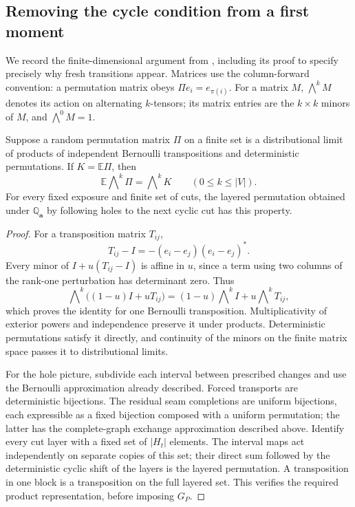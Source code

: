 \subsection{Removing the cycle condition from a first moment}

We record the finite-dimensional argument from
\cite[Lemma~4.2 and Proposition~4.3]{Ordering}, including its proof
to specify precisely why fresh transitions appear.  Matrices use the
column-forward convention: a permutation matrix obeys
$\Pi e_i=e_{\pi(i)}$.  For a matrix $M$, $\bigwedge^kM$ denotes
its action on alternating $k$-tensors; its matrix entries are the
$k\times k$ minors of $M$, and $\bigwedge^0M=1$.

\begin{lemma}\label{lem:exterior-moments}
Suppose a random permutation matrix $\Pi$ on a finite set is a
distributional limit of products of independent Bernoulli
transpositions and deterministic permutations.  If $K=\mathbb E\Pi$,
then
\begin{equation}\label{eq:exterior-moments}
            \mathbb E\bigwedge\nolimits^k\Pi=\bigwedge\nolimits^kK
                        \qquad(0\le k\le|V|).
\end{equation}
For every fixed exposure and finite set of cuts, the layered
permutation obtained under $\mathbb Q_{\mathbf a}$ by following
holes to the next cyclic cut has this property.
\end{lemma}

\begin{proof}
For a transposition matrix $T_{ij}$,
\[
                 T_{ij}-I=-(e_i-e_j)(e_i-e_j)^*.
\]
Every minor of $I+u(T_{ij}-I)$ is affine in $u$, since a term using
two columns of the rank-one perturbation has determinant zero.
Thus
\[
 \bigwedge\nolimits^k\bigl((1-u)I+uT_{ij}\bigr)
   =(1-u)\bigwedge\nolimits^kI+u\bigwedge\nolimits^kT_{ij},
\]
which proves the identity for one Bernoulli transposition.
Multiplicativity of exterior powers and independence preserve it
under products.  Deterministic permutations satisfy it directly,
and continuity of the minors on the finite matrix space passes it
to distributional limits.

For the hole picture, subdivide each interval between prescribed
changes and use the Bernoulli approximation already described.
Forced transports are deterministic bijections.  The residual seam
completions are uniform bijections, each expressible as a fixed
bijection composed with a uniform permutation; the latter has the
complete-graph exchange approximation described above.  Identify
every cut layer with a fixed set of $|H_t|$ elements.  The interval
maps act independently on separate copies of this set; their direct
sum followed by the deterministic cyclic shift of the layers is
the layered permutation.  A transposition in one block is a
transposition on the full layered set.  This verifies the required
product representation, before imposing $G_P$.
\end{proof}

